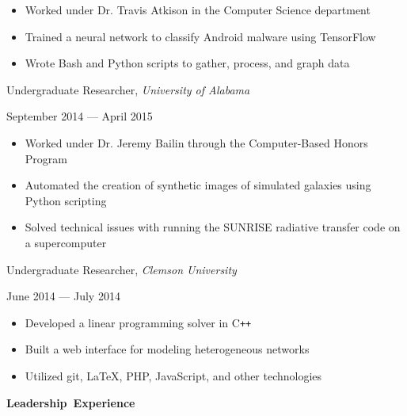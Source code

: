 \documentclass[11pt]{article}
\begin{document}
\begin{itemize}
  \item Worked under Dr. Travis Atkison in the Computer Science department
  \item Trained a neural network to classify Android malware using TensorFlow
  \item Wrote Bash and Python scripts to gather, process, and graph data
\end{itemize}

\vspace{0.4em}
\begin{minipage}[t]{0.65\textwidth}
\flushleft
Undergraduate Researcher, \textit{University of Alabama}\\
\end{minipage}
\begin{minipage}[t]{0.30\textwidth}
\flushright
September 2014 --- April 2015\\
\end{minipage}

\begin{itemize}
  \item Worked under Dr. Jeremy Bailin through the Computer-Based Honors Program
  \item Automated the creation of synthetic images of simulated galaxies using Python scripting
  \item Solved technical issues with running the SUNRISE radiative transfer code on a supercomputer
\end{itemize}

\begin{minipage}[t]{0.65\textwidth}
\flushleft
Undergraduate Researcher, \textit{Clemson University}\\
\end{minipage}
\begin{minipage}[t]{0.30\textwidth}
\flushright
June 2014 --- July 2014\\
\end{minipage}

\begin{itemize}
  \item Developed a linear programming solver in C\texttt{++}
  \item Built a web interface for modeling heterogeneous networks
  \item Utilized git, \LaTeX, PHP, JavaScript, and other technologies
\end{itemize}

\vspace{0.6em}
\hbox{\large \textbf{Leadership Experience}}
\end{document}
